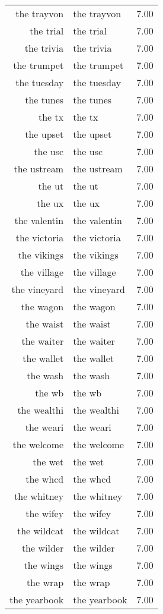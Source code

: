 \begin{table}[ht]
\begin{tabular}{rlr}
  the trayvon & the trayvon & 7.00 \\ 
  the trial & the trial & 7.00 \\ 
  the trivia & the trivia & 7.00 \\ 
  the trumpet & the trumpet & 7.00 \\ 
  the tuesday & the tuesday & 7.00 \\ 
  the tunes & the tunes & 7.00 \\ 
  the tx & the tx & 7.00 \\ 
  the upset & the upset & 7.00 \\ 
  the usc & the usc & 7.00 \\ 
  the ustream & the ustream & 7.00 \\ 
  the ut & the ut & 7.00 \\ 
  the ux & the ux & 7.00 \\ 
  the valentin & the valentin & 7.00 \\ 
  the victoria & the victoria & 7.00 \\ 
  the vikings & the vikings & 7.00 \\ 
  the village & the village & 7.00 \\ 
  the vineyard & the vineyard & 7.00 \\ 
  the wagon & the wagon & 7.00 \\ 
  the waist & the waist & 7.00 \\ 
  the waiter & the waiter & 7.00 \\ 
  the wallet & the wallet & 7.00 \\ 
  the wash & the wash & 7.00 \\ 
  the wb & the wb & 7.00 \\ 
  the wealthi & the wealthi & 7.00 \\ 
  the weari & the weari & 7.00 \\ 
  the welcome & the welcome & 7.00 \\ 
  the wet & the wet & 7.00 \\ 
  the whcd & the whcd & 7.00 \\ 
  the whitney & the whitney & 7.00 \\ 
  the wifey & the wifey & 7.00 \\ 
  the wildcat & the wildcat & 7.00 \\ 
  the wilder & the wilder & 7.00 \\ 
  the wings & the wings & 7.00 \\ 
  the wrap & the wrap & 7.00 \\ 
  the yearbook & the yearbook & 7.00 \\ 

\end{tabular}
\end{table}
